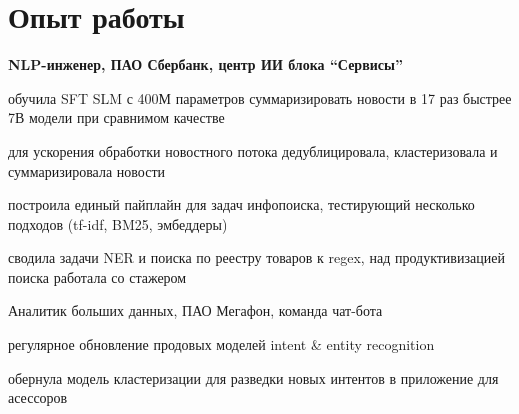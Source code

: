 \documentclass[11pt]{article} %
\begin{document}
\section*{Опыт работы}

 \textbf{NLP-инженер, ПАО Сбербанк, центр ИИ блока ``Сервисы''}


\begin{minipage}[t]{0.95\linewidth}

    \begin{multicols}{2}
\begin{compactitem}[\ding{90}]
	\item обучила SFT SLM с 400М параметров суммаризировать новости в 17 раз быстрее 7В модели при сравнимом качестве
	\item для ускорения обработки новостного потока дедублицировала, кластеризовала и суммаризировала новости
	\item построила единый пайплайн для задач инфопоиска, тестирующий несколько подходов (tf-idf, BM25, эмбеддеры)
	\item сводила задачи NER и поиска по реестру товаров к regex, над продуктивизацией поиска работала со стажером
\end{compactitem}
	\end{multicols}
	
\end{minipage}

	\vspace*{.5em}

 Аналитик больших данных, ПАО Мегафон, команда чат-бота

\begin{minipage}[t]{0.95\linewidth}

    \begin{multicols}{2}
\begin{compactitem}[\ding{165}]
	\item регулярное обновление продовых моделей intent \& entity recognition
	\item обернула модель кластеризации для разведки новых интентов в приложение для асессоров
\end{compactitem}
	\end{multicols}

\end{minipage}
	
\end{document}
